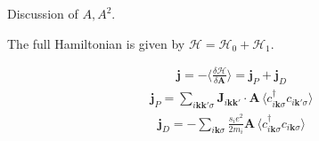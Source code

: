 \documentclass[aps,prb,reprint,noeprint,superscriptaddress]{revtex4-1}
\begin{document}
Discussion of $A, A^2$.

The full Hamiltonian is given by $\mathcal{H} = \mathcal{H}_0 +
\mathcal{H}_1$.

\begin{eqnarray*}
  \mathbf{j} = - \bigg\langle \frac{\delta\mathcal{H}}{\delta
  \mathbf{A}}\bigg\rangle = \mathbf{j}_P + \mathbf{j}_D
\end{eqnarray*}
\begin{eqnarray*}
  \mathbf{j}_P = \sum_{i\mathbf{kk'}\sigma}^{}
	\mathbf{J}_{i\mathbf{kk'}} \cdot \mathbf{A} \,
	\langle 
	c_{i\mathbf{k}\sigma}^\dagger  c_{i\mathbf{k}'\sigma}
	\rangle
\end{eqnarray*}
\begin{eqnarray*}
  \mathbf{j}_D = -\sum_{i\mathbf{k}\sigma}^{} \frac{s_i e^2}{2m_i} 
  \mathbf{A} \,
  \langle 
  c_{i\mathbf{k}\sigma}^\dagger c_{i\mathbf{k}\sigma}
  \rangle
\end{eqnarray*}
\end{document}
